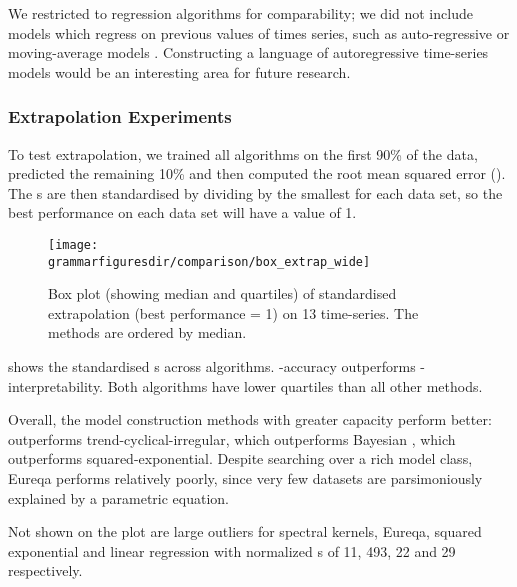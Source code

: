 We restricted to regression algorithms for comparability; we did not include models which regress on previous values of times series, such as auto-regressive or moving-average models \citep[e.g.][]{box2013time}.
Constructing a language of autoregressive time-series models would be an interesting area for future research.



\subsubsection{Extrapolation Experiments}

To test extrapolation, we trained all algorithms on the first 90\% of the data, predicted the remaining 10\% and then computed the root mean squared error (\RMSE{}).
The \RMSE{}s are then standardised by dividing by the smallest \RMSE{} for each data set, so the best performance on each data set will have a value of 1.

\begin{figure}[h!]
\texttt{[image: \\grammarfiguresdir/comparison/box\_extrap\_wide]}
\caption[Comparison of extrapolation error of all methods on 13 time-series datasets.]
{Box plot (showing median and quartiles) of standardised extrapolation \RMSE{} (best performance = 1) on 13 time-series.
The methods are ordered by median.
}
\label{fig:box_extrap_dist}
\end{figure}


 shows the standardised \RMSE{}s across algorithms.
\procedurename{}-accuracy outperforms \procedurename{}-interpretability.
Both algorithms have lower quartiles than all other methods.

Overall, the model construction methods with greater capacity perform better: \procedurename{} outperforms trend-cyclical-irregular, which outperforms Bayesian \MKL{}, which outperforms squared-exponential.
Despite searching over a rich model class, Eureqa performs relatively poorly, since very few datasets are parsimoniously explained by a parametric equation.

Not shown on the plot are large outliers for spectral kernels, Eureqa, squared exponential and linear regression with normalized \RMSE{}s of 11, 493, 22 and 29 respectively.


